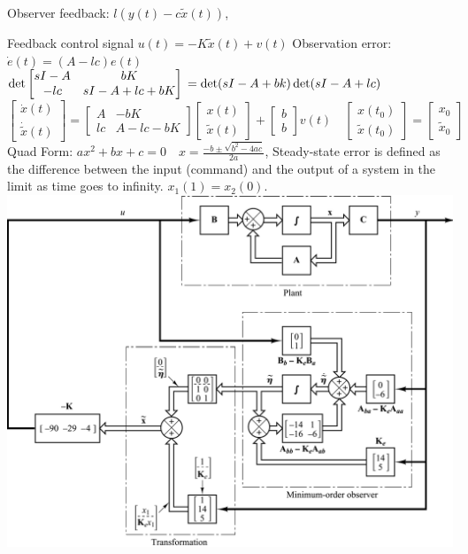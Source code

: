 Observer feedback: $l(y(t)-c\tilde{x}(t))$,

Feedback control signal $u(t)=-K\tilde{x}(t)+v(t)$ \hfill \break 
Observation error: $\dot{e}(t)=(A-lc)e(t)$
$\det \begin{bmatrix}sI-A & bK \\
-lc & sI-A+lc+bK
\end{bmatrix} \\ =\det(sI-A+bk)\det(sI-A+lc)$
$\begin{bmatrix}
\dot{x}(t) \\
\dot{\tilde{x}}(t)
\end{bmatrix}= \begin{bmatrix}
A  & -bK \\
lc & A-lc-bK
\end{bmatrix}\begin{bmatrix}
x(t) \\
{\tilde{x}}(t)
\end{bmatrix}+
\begin{bmatrix}
b \\ b
\end{bmatrix} v(t) \quad 
\begin{bmatrix}
x(t_0) \\ \tilde{x}(t_0)
\end{bmatrix}=
\begin{bmatrix}
x_0 \\ \tilde{x}_0
\end{bmatrix}
$
\vspace{0.1 cm}
Quad Form: $ax^2+bx+c=0 \quad x= \frac{-b \pm \sqrt{b^2-4ac}}{2a}$,
Steady-state error is defined as the difference between the input (command) and the output of a system in the limit as time goes to infinity. $x_1(1)=x_2(0)$.
\includegraphics[width=\linewidth]{fullEstimateobs.png}
